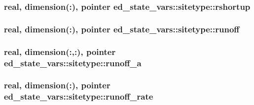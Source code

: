 \subsubsection[{\texorpdfstring{rshortup}{rshortup}}]{\setlength{\rightskip}{0pt plus 5cm}real, dimension(\+:), pointer ed\+\_\+state\+\_\+vars\+::sitetype\+::rshortup}\hypertarget{structed__state__vars_1_1sitetype_acdd2f415004acae5f242c785a89d01e8}{}\label{structed__state__vars_1_1sitetype_acdd2f415004acae5f242c785a89d01e8}
\subsubsection[{\texorpdfstring{runoff}{runoff}}]{\setlength{\rightskip}{0pt plus 5cm}real, dimension(\+:), pointer ed\+\_\+state\+\_\+vars\+::sitetype\+::runoff}\hypertarget{structed__state__vars_1_1sitetype_a505920799c9fbba2c8da78e190fd85e9}{}\label{structed__state__vars_1_1sitetype_a505920799c9fbba2c8da78e190fd85e9}
\subsubsection[{\texorpdfstring{runoff\+\_\+a}{runoff_a}}]{\setlength{\rightskip}{0pt plus 5cm}real, dimension(\+:,\+:), pointer ed\+\_\+state\+\_\+vars\+::sitetype\+::runoff\+\_\+a}\hypertarget{structed__state__vars_1_1sitetype_a2b8d17aeef517cb4e97ad81d3e709b47}{}\label{structed__state__vars_1_1sitetype_a2b8d17aeef517cb4e97ad81d3e709b47}
\subsubsection[{\texorpdfstring{runoff\+\_\+rate}{runoff_rate}}]{\setlength{\rightskip}{0pt plus 5cm}real, dimension(\+:), pointer ed\+\_\+state\+\_\+vars\+::sitetype\+::runoff\+\_\+rate}\hypertarget{structed__state__vars_1_1sitetype_a608500a8f7ada46291e883d8fec60003}{}\label{structed__state__vars_1_1sitetype_a608500a8f7ada46291e883d8fec60003}
